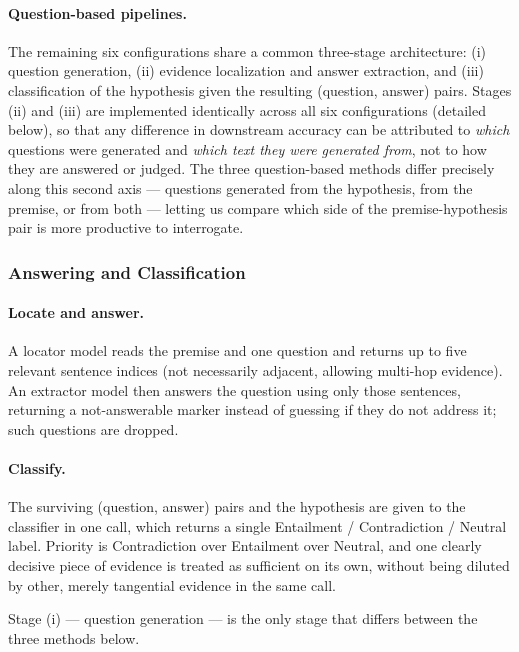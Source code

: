\paragraph{Question-based pipelines.} The remaining six configurations share a
common three-stage architecture: (i) question generation, (ii) evidence
localization and answer extraction, and (iii) classification of the
hypothesis given the resulting (question, answer) pairs. Stages (ii) and
(iii) are implemented identically across all six configurations (detailed
below), so that any difference in downstream accuracy can be attributed to
\emph{which} questions were generated and \emph{which text they were
generated from}, not to how they are answered or judged. The three
question-based methods differ precisely along this second axis --- questions
generated from the hypothesis, from the premise, or from both --- letting us
compare which side of the premise-hypothesis pair is more productive to
interrogate.

\subsubsection{Answering and Classification}

\paragraph{Locate and answer.} A locator model reads the premise and one
question and returns up to five relevant sentence indices (not necessarily
adjacent, allowing multi-hop evidence). An extractor model then answers the
question using only those sentences, returning a not-answerable marker
instead of guessing if they do not address it; such questions are dropped.

\paragraph{Classify.} The surviving (question, answer) pairs and the
hypothesis are given to the classifier in one call, which returns a single
Entailment / Contradiction / Neutral label. Priority is Contradiction over
Entailment over Neutral, and one clearly decisive piece of evidence is
treated as sufficient on its own, without being diluted by other, merely
tangential evidence in the same call.

Stage (i) --- question generation --- is the only stage that differs between
the three methods below.

